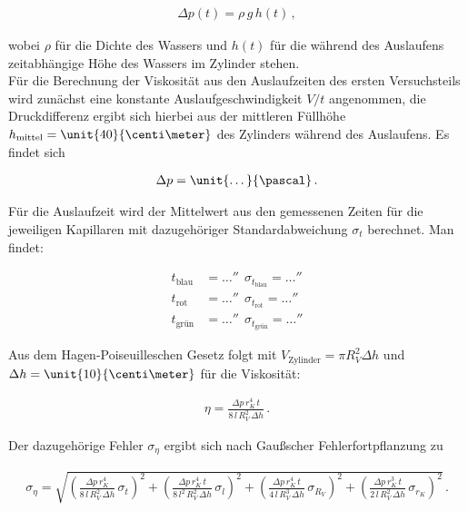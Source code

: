 \begin{align}
\Delta p(t) = \rho\, g \, h(t)\, ,
\end{align}

\noindent wobei $\rho$ für die Dichte des Wassers und $h(t)$ für die während des Auslaufens zeitabhängige Höhe des Wassers im Zylinder stehen.\\
Für die Berechnung der Viskosität aus den Auslaufzeiten des ersten Versuchsteils wird zunächst eine konstante Auslaufgeschwindigkeit $V/t$ angenommen, die Druckdifferenz ergibt sich hierbei aus der mittleren Füllhöhe $h_\text{mittel}=\unit{40}{\centi\meter}$ des Zylinders während des Auslaufens. Es findet sich

\begin{align*}
\Delta p = \unit{\dots}{\pascal}\, .
\end{align*}

\noindent Für die Auslaufzeit wird der Mittelwert aus den gemessenen Zeiten für die jeweiligen Kapillaren mit dazugehöriger Standardabweichung $\sigma_t$ berechnet. Man findet:

\begin{align*}
t_{\text{blau}} &= \unit{\dots}{\second} ~~ \sigma_{t_{\text{blau}}} = \unit{\dots}{\second}\\
t_{\text{rot}} &= \unit{\dots}{\second} ~~ \sigma_{t_{\text{rot}}} = \unit{\dots}{\second}\\
t_{\text{gr\"un}} &= \unit{\dots}{\second} ~~ \sigma_{t_{\text{gr\"un}}} = \unit{\dots}{\second}
\end{align*}

\noindent Aus dem Hagen-Poiseuilleschen Gesetz folgt mit $V_{\text{Zylinder}} = \pi R_V^2 \Delta h$ und $\Delta h =\unit{10}{\centi\meter}$ für die Viskosität:

\begin{align}
\eta = \frac{\Delta p\, r_K^4\, t}{8\, l \, R_V^2\,\Delta h}\, .
\end{align}

\noindent Der dazugehörige Fehler $\sigma_{\eta}$ ergibt sich nach Gaußscher Fehlerfortpflanzung zu

\begin{align}
\sigma_{\eta} = \sqrt{\left(\frac{\Delta p \, r_K^4}{8\, l \, R_V^2\,\Delta h}\,\sigma_t\right)^2 + \left(\frac{\Delta p \, r_K^4 \, t}{8\, l^2 \, R_V^2\,\Delta h}\,\sigma_l\right)^2 + \left(\frac{\Delta p \, r_K^4 \, t}{4\, l \, R_V^3\,\Delta h}\,\sigma_{R_V}\right)^2 + \left(\frac{\Delta p \, r_K^3 \, t}{2\, l \, R_V^2\,\Delta h}\,\sigma_{r_K}\right)^2}\, .
\end{align}

